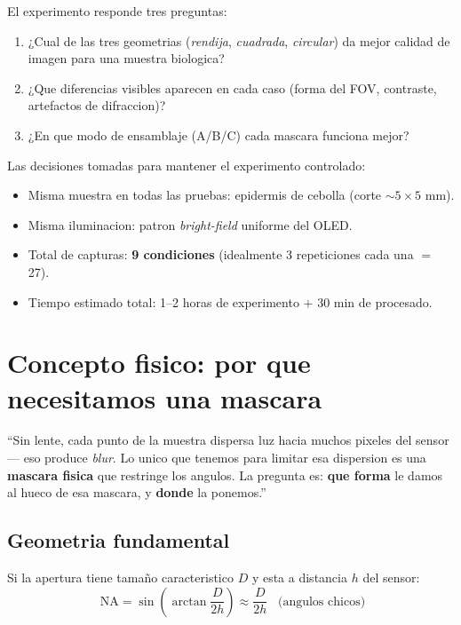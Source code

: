 \documentclass[11pt,a4paper,oneside]{report}
\begin{document}
El experimento responde tres preguntas:

\begin{enumerate}[leftmargin=2.2em]
  \item ¿Cual de las tres geometrias (\emph{rendija}, \emph{cuadrada}, \emph{circular})
        da mejor calidad de imagen para una muestra biologica?
  \item ¿Que diferencias visibles aparecen en cada caso (forma del FOV, contraste,
        artefactos de difraccion)?
  \item ¿En que modo de ensamblaje (A/B/C) cada mascara funciona mejor?
\end{enumerate}

Las decisiones tomadas para mantener el experimento controlado:

\begin{itemize}[leftmargin=2.2em]
  \item Misma muestra en todas las pruebas: epidermis de cebolla (corte $\sim 5\times 5$ mm).
  \item Misma iluminacion: patron \emph{bright-field} uniforme del OLED.
  \item Total de capturas: \textbf{9 condiciones} (idealmente 3 repeticiones cada una $=$ 27).
  \item Tiempo estimado total: 1--2 horas de experimento $+$ 30 min de procesado.
\end{itemize}

\chapter{Concepto fisico: por que necesitamos una mascara}

\begin{decir}
``Sin lente, cada punto de la muestra dispersa luz hacia muchos pixeles del sensor
--- eso produce \emph{blur}. Lo unico que tenemos para limitar esa dispersion es una
\textbf{mascara fisica} que restringe los angulos. La pregunta es: \textbf{que forma}
le damos al hueco de esa mascara, y \textbf{donde} la ponemos.''
\end{decir}

\section{Geometria fundamental}

Si la apertura tiene tamaño caracteristico $D$ y esta a distancia $h$ del sensor:
\begin{equation}
\boxed{\;\mathrm{NA} = \sin\!\left(\arctan\!\frac{D}{2h}\right) \approx \frac{D}{2h}\;\;\;\text{(angulos chicos)}}
\label{eq:na}
\end{equation}
\end{document}
